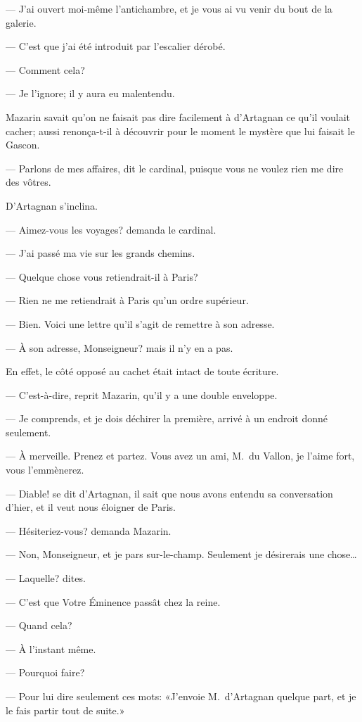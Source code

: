 — J'ai ouvert moi-même l'antichambre, et je vous ai vu venir du bout de la galerie.

— C'est que j'ai été introduit par l'escalier dérobé.

— Comment cela?

— Je l'ignore; il y aura eu malentendu.

Mazarin savait qu'on ne faisait pas dire facilement à d'Artagnan ce qu'il voulait cacher; aussi renonça-t-il à découvrir pour le moment le mystère que lui faisait le Gascon.

— Parlons de mes affaires, dit le cardinal, puisque vous ne voulez rien me dire des vôtres.

D'Artagnan s'inclina.

— Aimez-vous les voyages? demanda le cardinal.

— J'ai passé ma vie sur les grands chemins.

— Quelque chose vous retiendrait-il à Paris?

— Rien ne me retiendrait à Paris qu'un ordre supérieur.

— Bien. Voici une lettre qu'il s'agit de remettre à son adresse.

— À son adresse, Monseigneur? mais il n'y en a pas.

En effet, le côté opposé au cachet était intact de toute écriture.

— C'est-à-dire, reprit Mazarin, qu'il y a une double enveloppe.

— Je comprends, et je dois déchirer la première, arrivé à un endroit donné seulement.

— À merveille. Prenez et partez. Vous avez un ami, M.~du Vallon, je l'aime fort, vous l'emmènerez.

— Diable! se dit d'Artagnan, il sait que nous avons entendu sa conversation d'hier, et il veut nous éloigner de Paris.

— Hésiteriez-vous? demanda Mazarin.

— Non, Monseigneur, et je pars sur-le-champ. Seulement je désirerais une chose\dots

— Laquelle? dites.

— C'est que Votre Éminence passât chez la reine.

— Quand cela?

— À l'instant même.

— Pourquoi faire?

— Pour lui dire seulement ces mots: «J'envoie M.~d'Artagnan quelque part, et je le fais partir tout de suite.»

